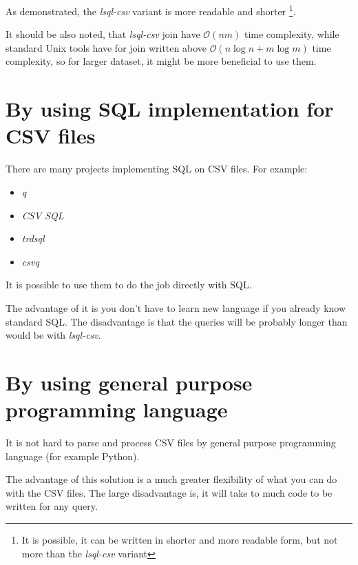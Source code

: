 As demonstrated, the \textit{lsql-csv} variant is more readable and shorter 
\footnote{It is possible, it can be written in shorter and more readable form, but not more than the \textit{lsql-csv} variant}.

It should be also noted, that \textit{lsql-csv} join have $\mathcal{O}(nm)$ time complexity, while standard Unix tools have for join written above
$\mathcal{O}(n\log n + m\log m)$ time complexity, so for larger dataset, it might be more beneficial to use them.

\section{By using SQL implementation for CSV files}
There are many projects implementing SQL on CSV files. For example:
\begin{itemize}
    \item \textit{q} \cite{q}
    \item \textit{CSV SQL} \cite{csv-sql} 
    \item \textit{trdsql} \cite{trdsql}
    \item \textit{csvq} \cite{csvq}
\end{itemize}

It is possible to use them to do the job directly with SQL. 

The advantage of it is you don't have to learn new language if you already know standard SQL. 
The disadvantage is that the queries will be probably longer than would be with \textit{lsql-csv}.

\section{By using general purpose programming language}
It is not hard to parse and process CSV files by general purpose programming language (for example Python).

The advantage of this solution is a much greater flexibility of what you can do with the CSV files.
The large disadvantage is, it will take to much code to be written for any query.


